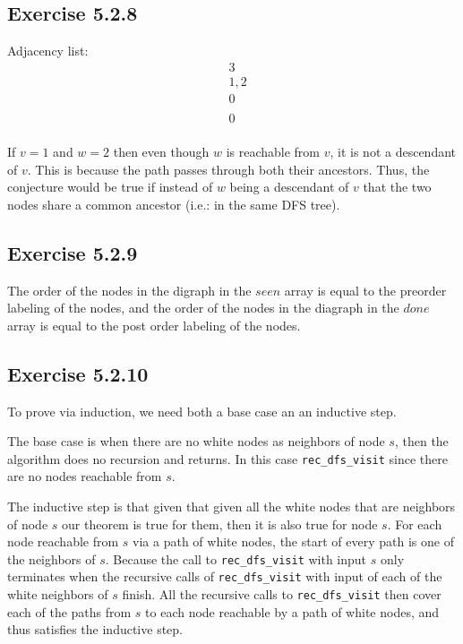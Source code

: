 \documentclass{article}
\begin{document}
\subsection*{Exercise 5.2.8}

Adjacency list:
\begin{align*}
& 3 \\
& 1,2 \\
& 0 \\
& \\
& 0 \\
\end{align*}

If \(v=1\) and \(w=2\) then even though \(w\) is reachable from \(v\), it is not a descendant of \(v\). This is because the path passes through both their ancestors. Thus, the conjecture would be true if instead of \(w\) being a descendant of \(v\) that the two nodes share a common ancestor (i.e.: in the same DFS tree).


\subsection*{Exercise 5.2.9} 

The order of the nodes in the digraph in the \(seen\) array is equal to the preorder labeling of the nodes, and the order of the nodes in the diagraph in the \(done\) array is equal to the post order labeling of the nodes.


\subsection*{Exercise 5.2.10}

To prove via induction, we need both a base case an an inductive step.

The base case is when there are no white nodes as neighbors of node \(s\), then the algorithm does no recursion and returns. In this case \texttt{rec\_dfs\_visit} since there are no nodes reachable from \(s\).

The inductive step is that given that given all the white nodes that are neighbors of node \(s\) our theorem is true for them, then it is also true for node \(s\). For each node reachable from \(s\) via a path of white nodes, the start of every path is one of the neighbors of \(s\). Because the call to \texttt{rec\_dfs\_visit} with input \(s\) only terminates when the recursive calls of \texttt{rec\_dfs\_visit} with input of each of the white neighbors of \(s\) finish. 
All the recursive calls to \texttt{rec\_dfs\_visit} then cover each of the paths from \(s\) to each node reachable by a path of white nodes, and thus satisfies the inductive step.
\end{document}
